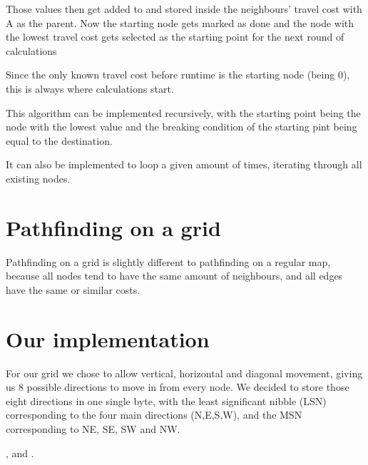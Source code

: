 Those values then get added to and stored  inside the neighbours' travel cost with A as the parent.
Now the starting node gets marked as done
and the node with the lowest travel cost gets selected
as the starting point for the next round of calculations

Since the only known travel cost before runtime is the starting node (being 0),
this is always where calculations start.

This algorithm can be implemented recursively,
with the starting point being the node with the lowest value
and the breaking condition of the starting pint being equal to the destination.

It can also be implemented to loop a given amount of times,
iterating through all existing nodes.

\section{Pathfinding on a grid}
Pathfinding on a grid is slightly different to pathfinding on a regular map,
because all nodes tend to have the same amount of neighbours,
and all edges have the same or similar costs.


\section{Our implementation}
For our grid we chose to allow vertical, horizontal and diagonal movement,
giving us 8 possible directions to move in from every node.
We decided to store those eight directions in one single byte,
with the least significant nibble (LSN) corresponding to the four main directions (N,E,S,W),
and the MSN corresponding to NE, SE, SW and NW.



\cite{Madsen2010}, \cite{Oetiker2010} and \cite{Mittelbach2005}.